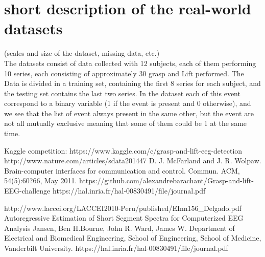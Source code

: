 \documentclass[final,leqno,onefignum,onetabnum]{siamltexmm}
\begin{document}

\section{short description of the real-world datasets}
(scales and size of the dataset, missing data, etc.)\\
The  datasets consist of data collected with 12 subjects, each of them performing 10 series, each consisting of approximately 30 grasp and Lift performed. The Data is divided in a  training set, containing the first 8 series for each subject, and  the testing set contains the last two series.
In the dataset each of this event correspond to a binary variable (1 if the event is present and 0 otherwise), and we see that the list of event always present in the same other, but the event are not all mutually exclusive meaning that some of  them could be 1 at the same time.  
 




  \begin{thebibliography}{1}
     Kaggle competition:  https://www.kaggle.com/c/grasp-and-lift-eeg-detection
     http://www.nature.com/articles/sdata201447
    D. J. McFarland and J. R. Wolpaw. Brain-computer interfaces for communication and control.
Commun. ACM, 54(5):60?66, May 2011.
    https://github.com/alexandrebarachant/Grasp-and-lift-EEG-challenge
    https://hal.inria.fr/hal-00830491/file/journal.pdf

    http://www.laccei.org/LACCEI2010-Peru/published/EInn156\_Delgado.pdf
    Autoregressive Estimation of Short Segment Spectra for Computerized EEG Analysis Jansen, Ben H.Bourne, John R. Ward, James W. Department of Electrical and Biomedical Engineering, School of
Engineering, School of Medicine, Vanderbilt University. 
    https://hal.inria.fr/hal-00830491/file/journal.pdf


  \end{thebibliography} 


  
\end{document}
